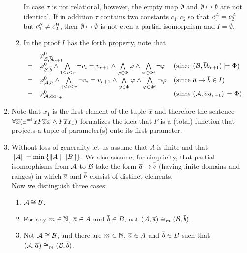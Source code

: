\begin{enumerate}[1.]
\begin{enumerate}[(1)]
In case $\tau$ is not relational, however, the empty map $\emptyset$ and $\emptyset \mapsto \emptyset$ are not identical. If in addition $\tau$ contains two constants $c_1, c_2$ so that $c_1^{\mathcal{A}} = c_2^{\mathcal{A}}$ but $c_1^{\mathcal{B}} \neq c_2^{\mathcal{B}}$, then $\emptyset \mapsto \emptyset$ is not even a partial isomorphism and $I = \emptyset$.
\item In the proof $I$ has the forth property, note that
\[
\begin{array}{lll}
\ & \hint{0}{\strct{B}, \vect{b}b_{r + 1}} & \cr
= & \hint{0}{\strct{B}, \vect{b}} \land \bland\limits_{1 \leq i \leq r} \neg v_i = v_{r + 1} \land \bland\limits_{\varphi \in \Phi} \varphi \land \bland\limits_{\varphi \in \cmpl{\Phi}} \neg\varphi & \text{(since \mathmode{(\strct{B}, \vect{b}b_{r + 1}) \satis \Phi})} \cr
= & \hint{0}{\strct{A}, \vect{a}} \land \bland\limits_{1 \leq i \leq r} \neg v_i = v_{r + 1}\land \bland\limits_{\varphi \in \Phi} \varphi \land \bland\limits_{\varphi \in \cmpl{\Phi}} \neg\varphi & \text{(since \mathmode{\vect{a} \mapsto \vect{b} \in I})} \cr
= & \hint{0}{\strct{A}, \vect{a}a_{r + 1}} & \text{(since \mathmode{(\strct{A}, \vect{a}a_{r + 1}) \satis \Phi})}. \cr
\end{array}
\]
\end{enumerate}
%
\item {} Note that $x_1$ is the first element of the tuple $\overline{x}$ and therefore the sentence $\forall \overline{x} (\exists^{= 1}x F\overline{x}x \land F\overline{x}x_1)$ formalizes the idea that $F$ is a (total) function that projects a tuple of parameter(s) onto its first parameter.
%
\item {} Without loss of generality let us assume that $A$ is finite and that $\|A\| = \min{\{\|A\|, \|B\|\}}$. We also assume, for simplicity, that partial isomorphisms from $\mathcal{A}$ to $\mathcal{B}$ take the form $\overline{a} \mapsto \overline{b}$ (having finite domains and ranges) in which $\overline{a}$ and $\overline{b}$ consist of distinct elements.
\medskip\\
Now we distinguish three cases:
\begin{enumerate}[(1)]
\item $\strct{A} \isom \strct{B}$.
\item For any $m \in \mathbb{N}$, $\overline{a} \in A$ and $\overline{b} \in B$, not $(\strct{A}, \vect{a}) \isom_m (\strct{B}, \vect{b})$.
\item Not $\strct{A} \isom \strct{B}$, and there are $m \in \mathbb{N}$, $\overline{a} \in A$ and $\overline{b} \in B$ such that $(\strct{A}, \vect{a}) \isom_m (\strct{B}, \vect{b})$.

\end{enumerate}
\end{enumerate}
